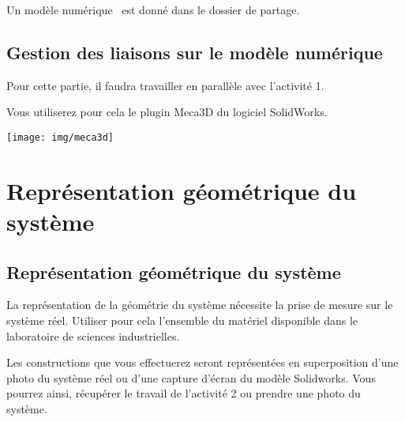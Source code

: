Un modèle numérique \dusysteme \ est donné dans le dossier de partage.



\subsection{Gestion des liaisons sur le modèle numérique}

Pour cette partie, il faudra travailler en parallèle avec l'activité 1.


\begin{minipage}{0.45\linewidth}
Vous utiliserez pour cela le plugin Meca3D du logiciel SolidWorks.
\end{minipage}
\hfill
\begin{minipage}{0.5\linewidth}
\texttt{[image: img/meca3d]}
\end{minipage}

\section{Représentation géométrique du système}

\subsection{Représentation géométrique du système}

La représentation de la géométrie du système nécessite la prise de mesure sur le système réel. Utiliser pour cela l'ensemble du matériel disponible dans le laboratoire de sciences industrielles.

Les constructions que vous effectuerez seront représentées en superposition d'une photo du système réel ou d'une capture d'écran du modèle Solidworks. Vous pourrez ainsi, récupérer le travail de l'activité 2 ou prendre une photo du système.


